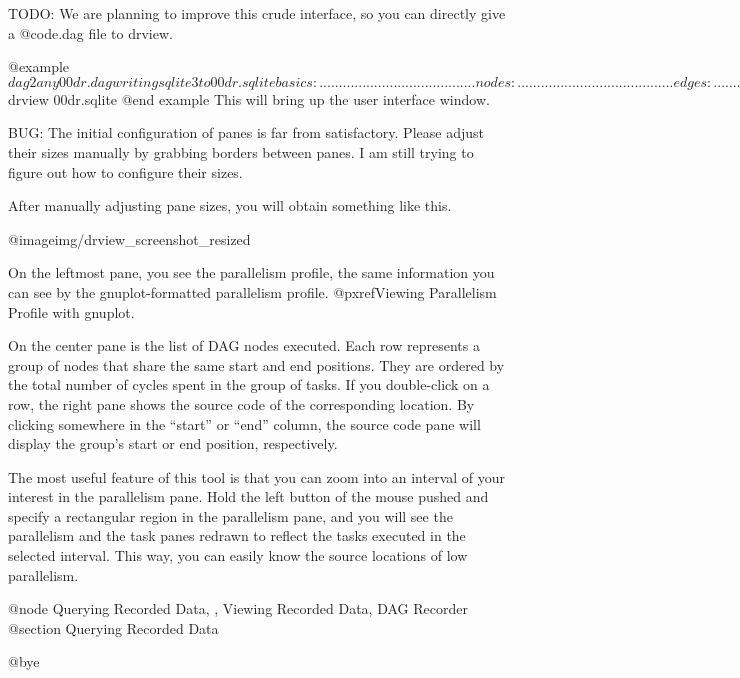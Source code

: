 TODO: We are planning to improve this crude interface, so you can
directly give a @code{.dag} file to drview.

@example
$ dag2any 00dr.dag 
writing sqlite3 to 00dr.sqlite
basics:  ........................................
nodes:   ........................................
edges:   ........................................
strings: ........................................
committing
$ drview 00dr.sqlite
@end example
This will bring up the user interface window.

BUG: The initial configuration of panes is far from satisfactory.
Please adjust their sizes manually by grabbing borders between panes.  I
am still trying to figure out how to configure their sizes.

After manually adjusting pane sizes, you will obtain something like this.

@image{img/drview_screenshot_resized}

On the leftmost pane, you see the parallelism profile, the same
information you can see by the gnuplot-formatted parallelism profile.
@pxref{Viewing Parallelism Profile with gnuplot}. 

On the center pane is the list of DAG nodes executed.  Each row
represents a group of nodes that share the same start and end positions.
They are ordered by the total number of cycles spent in the group of
tasks.  If you double-click on a row, the right pane shows the source
code of the corresponding location.  By clicking somewhere in the
``start'' or ``end'' column, the source code pane will display the
group's start or end position, respectively.

The most useful feature of this tool is that you can zoom into an
interval of your interest in the parallelism pane.  Hold the left button
of the mouse pushed and specify a rectangular region in the parallelism
pane, and you will see the parallelism and the task panes redrawn to
reflect the tasks executed in the selected interval.  This way, you can
easily know the source locations of low parallelism.

@node Querying Recorded Data,  , Viewing Recorded Data, DAG Recorder
@section Querying Recorded Data


@bye
                                   

